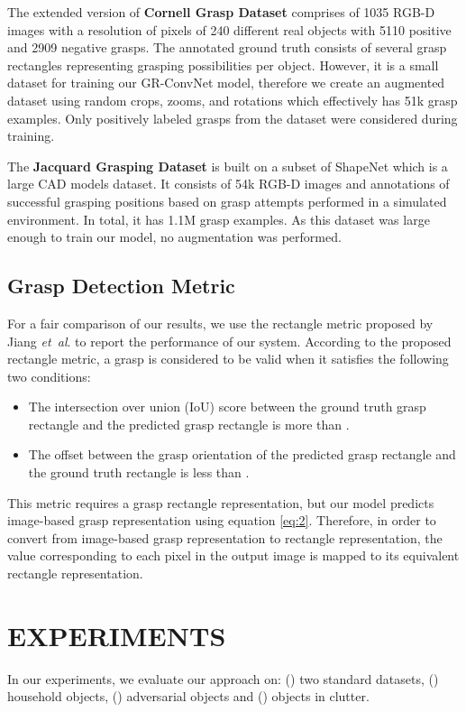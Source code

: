 \documentclass[letterpaper, 10 pt, conference]{ieeeconf}
\newcommand{\etal}{\textit{et~al}. }
\begin{document}
The extended version of \textbf{Cornell Grasp Dataset} comprises of 1035 RGB-D images with a resolution of  pixels of 240 different real objects with 5110 positive and 2909 negative grasps. The annotated ground truth consists of several grasp rectangles representing grasping possibilities per object. However, it is a small dataset for training our GR-ConvNet model, therefore we create an augmented dataset using random crops, zooms, and rotations which effectively has 51k grasp examples. Only positively labeled grasps from the dataset were considered during training. 


The \textbf{Jacquard Grasping Dataset} is built on a subset of ShapeNet which is a large CAD models dataset. It consists of 54k RGB-D images and annotations of successful grasping positions based on grasp attempts performed in a simulated environment. In total, it has 1.1M grasp examples. As this dataset was large enough to train our model, no augmentation was performed.


\subsection{Grasp Detection Metric}
For a fair comparison of our results, we use the rectangle metric \cite{jiang2011efficient} proposed by Jiang \etal to report the performance of our system. According to the proposed rectangle metric, a grasp is considered to be valid when it satisfies the following two conditions:
\begin{itemize}
    \item The intersection over union (IoU) score between the ground truth grasp rectangle and the predicted grasp rectangle is more than .
    \item The offset between the grasp orientation of the predicted grasp rectangle and the ground truth rectangle is less than .
\end{itemize}

This metric requires a grasp rectangle representation, but our model predicts image-based grasp representation  using equation \ref{eq:2}. Therefore, in order to convert from image-based grasp representation to rectangle representation, the value corresponding to each pixel in the output image is mapped to its equivalent rectangle representation.



\section{EXPERIMENTS}
In our experiments, we evaluate our approach on: () two standard datasets, () household objects, () adversarial objects and () objects in clutter.
\end{document}
